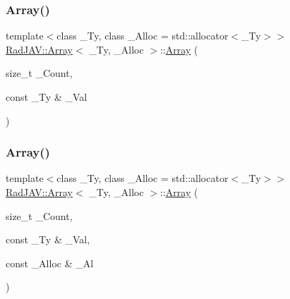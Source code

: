 \subsubsection{\texorpdfstring{Array()}{Array()}\hspace{0.1cm}{\footnotesize\ttfamily [5/9]}}
{\footnotesize\ttfamily template$<$class \+\_\+\+Ty, class \+\_\+\+Alloc = std\+::allocator$<$\+\_\+\+Ty$>$$>$ \\
\mbox{\hyperlink{class_rad_j_a_v_1_1_array}{Rad\+J\+A\+V\+::\+Array}}$<$ \+\_\+\+Ty, \+\_\+\+Alloc $>$\+::\mbox{\hyperlink{class_rad_j_a_v_1_1_array}{Array}} (\begin{DoxyParamCaption}\item[{size\+\_\+t}]{\+\_\+\+Count,  }\item[{const \+\_\+\+Ty \&}]{\+\_\+\+Val }\end{DoxyParamCaption})\hspace{0.3cm}{\ttfamily [inline]}}

\mbox{\label{class_rad_j_a_v_1_1_array_a11794fb3845651b5a471a14557e35ab0}} 
\subsubsection{\texorpdfstring{Array()}{Array()}\hspace{0.1cm}{\footnotesize\ttfamily [6/9]}}
{\footnotesize\ttfamily template$<$class \+\_\+\+Ty, class \+\_\+\+Alloc = std\+::allocator$<$\+\_\+\+Ty$>$$>$ \\
\mbox{\hyperlink{class_rad_j_a_v_1_1_array}{Rad\+J\+A\+V\+::\+Array}}$<$ \+\_\+\+Ty, \+\_\+\+Alloc $>$\+::\mbox{\hyperlink{class_rad_j_a_v_1_1_array}{Array}} (\begin{DoxyParamCaption}\item[{size\+\_\+t}]{\+\_\+\+Count,  }\item[{const \+\_\+\+Ty \&}]{\+\_\+\+Val,  }\item[{const \+\_\+\+Alloc \&}]{\+\_\+\+Al }\end{DoxyParamCaption})\hspace{0.3cm}{\ttfamily [inline]}}

\mbox{\label{class_rad_j_a_v_1_1_array_a1940daea9fd0bdb59bc2d872613ba28c}} 
